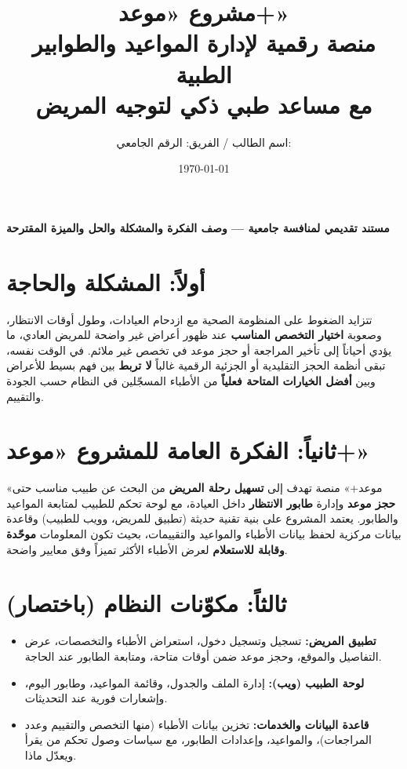 \documentclass[12pt,a4paper]{article}
\title{\textbf{مشروع «موعد+»\\منصة رقمية لإدارة المواعيد والطوابير الطبية\\مع مساعد طبي ذكي لتوجيه المريض}}
\author{اسم الطالب / الفريق: \underline{\hspace{6cm}} \quad الرقم الجامعي: \underline{\hspace{3cm}}}
\date{\today}
\begin{document}
\maketitle
\vspace{-0.5em}
\begin{center}\small
\textbf{مستند تقديمي لمنافسة جامعية — وصف الفكرة والمشكلة والحل والميزة المقترحة}
\end{center}
\vspace{0.6em}

\section*{أولاً: المشكلة والحاجة}
تتزايد الضغوط على المنظومة الصحية مع ازدحام العيادات، وطول أوقات الانتظار، وصعوبة \textbf{اختيار التخصص المناسب} عند ظهور أعراض غير واضحة للمريض العادي، ما يؤدي أحياناً إلى تأخير المراجعة أو حجز موعد في تخصص غير ملائم. في الوقت نفسه، تبقى أنظمة الحجز التقليدية أو الجزئية الرقمية غالباً \textbf{لا تربط} بين فهم بسيط للأعراض وبين \textbf{أفضل الخيارات المتاحة فعلياً} من الأطباء المسجّلين في النظام حسب الجودة والتقييم.

\section*{ثانياً: الفكرة العامة للمشروع «موعد+»}
«موعد+» منصة تهدف إلى \textbf{تسهيل رحلة المريض} من البحث عن طبيب مناسب حتى \textbf{حجز موعد} وإدارة \textbf{طابور الانتظار} داخل العيادة، مع لوحة تحكم للطبيب لمتابعة المواعيد والطابور. يعتمد المشروع على بنية تقنية حديثة (تطبيق للمريض، وويب للطبيب) وقاعدة بيانات مركزية لحفظ بيانات الأطباء والمواعيد والتقييمات، بحيث تكون المعلومات \textbf{موحّدة وقابلة للاستعلام} لعرض الأطباء الأكثر تميزاً وفق معايير واضحة.

\section*{ثالثاً: مكوّنات النظام (باختصار)}
\begin{itemize}
  \item \textbf{تطبيق المريض:} تسجيل وتسجيل دخول، استعراض الأطباء والتخصصات، عرض التفاصيل والموقع، وحجز موعد ضمن أوقات متاحة، ومتابعة الطابور عند الحاجة.
  \item \textbf{لوحة الطبيب (ويب):} إدارة الملف والجدول، وقائمة المواعيد، وطابور اليوم، وإشعارات فورية عند التحديثات.
  \item \textbf{قاعدة البيانات والخدمات:} تخزين بيانات الأطباء (منها التخصص والتقييم وعدد المراجعات)، والمواعيد، وإعدادات الطابور، مع سياسات وصول تحكم من يقرأ ويعدّل ماذا.
\end{itemize}
\end{document}
